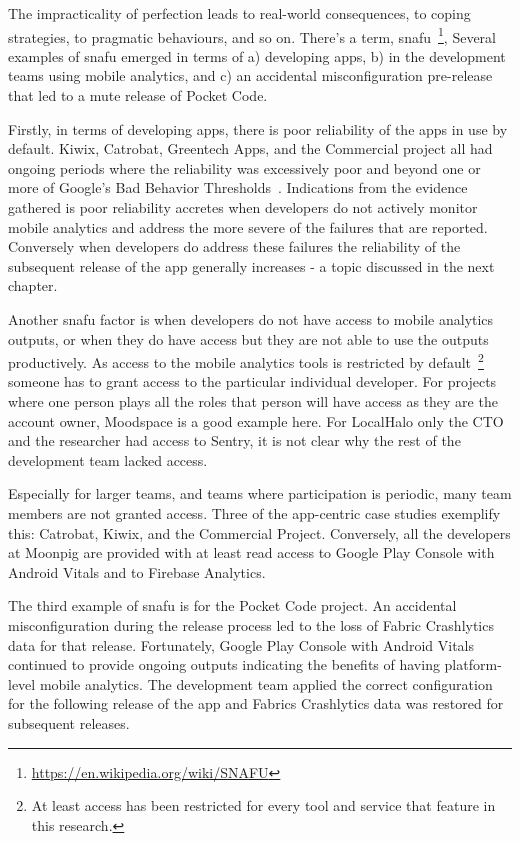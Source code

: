 The impracticality of perfection leads to real-world consequences, to coping strategies, to pragmatic behaviours, and so on. There's a term, snafu~\footnote{\url{https://en.wikipedia.org/wiki/SNAFU}}, Several examples of snafu emerged in terms of a) developing apps, b) in the development teams using mobile analytics, and c) an accidental misconfiguration pre-release that led to a mute release of Pocket Code.

Firstly, in terms of developing apps, there is poor reliability of the apps in use by default. Kiwix, Catrobat, Greentech Apps, and the Commercial project all had ongoing periods where the reliability was excessively poor and beyond one or more of Google's Bad Behavior Thresholds~\citep{play_console_help_android_vitals_2019}. Indications from the evidence gathered is poor reliability accretes when developers do not actively monitor mobile analytics and address the more severe of the failures that are reported. Conversely when developers do address these failures the reliability of the subsequent release of the app generally increases - a topic discussed in the next chapter.

Another snafu factor is when developers do not have access to mobile analytics outputs, or when they do have access but they are not able to use the outputs productively. As access to the mobile analytics tools is restricted by default~\footnote{At least access has been restricted for every tool and service that feature in this research.} someone has to grant access to the particular individual developer. For projects where one person plays all the roles that person will have access as they are the account owner, Moodspace is a good example here. For LocalHalo only the CTO and the researcher had access to Sentry, it is not clear why the rest of the development team lacked access.

Especially for larger teams, and teams where participation is periodic, many team members are not granted access. Three of the app-centric case studies exemplify this: Catrobat, Kiwix, and the Commercial Project. Conversely, all the developers at Moonpig are provided with at least read access to Google Play Console with Android Vitals and to Firebase Analytics.

The third example of snafu is for the Pocket Code project. An accidental misconfiguration during the release process led to the loss of Fabric Crashlytics data for that release. Fortunately, Google Play Console with Android Vitals continued to provide ongoing outputs indicating the benefits of having platform-level mobile analytics. The development team applied the correct configuration for the following release of the app and Fabrics Crashlytics data was restored for subsequent releases.

